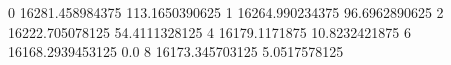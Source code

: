 0 16281.458984375 113.1650390625
1 16264.990234375 96.6962890625
2 16222.705078125 54.4111328125
4 16179.1171875 10.8232421875
6 16168.2939453125 0.0
8 16173.345703125 5.0517578125
